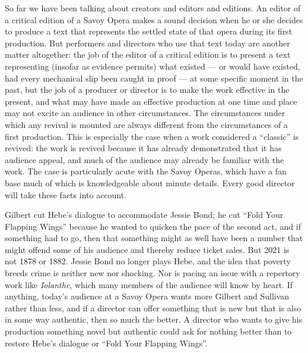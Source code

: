 \begin{paper}
So far we have been talking about creators and editors and editions. An
editor of a critical edition of a Savoy Opera makes a sound decision
when he or she decides to produce a text that represents the settled
state of that opera during its first production. But performers and
directors who use that text today are another matter altogether: the job
of the editor of a critical edition is to present a text representing
(insofar as evidence permits) what existed --- or would have existed, had
every mechanical slip been caught in proof --- at some specific moment in
the past, but the job of a producer or director is to make the work
effective in the present, and what may have made an effective production
at one time and place may not excite an audience in other circumstances.
The circumstances under which any revival is mounted are always
different from the circumstances of a first production. This is
especially the case when a work considered a ``classic'' is revived: the
work is revived because it has already demonstrated that it has audience
appeal, and much of the audience may already be familiar with the work.
The case is particularly acute with the Savoy Operas, which have a fan
base much of which is knowledgeable about minute details. Every good
director will take these facts into account.

Gilbert cut Hebe's dialogue to accommodate Jessie Bond; he cut ``Fold
Your Flapping Wings'' because he wanted to quicken the pace of the
second act, and if something had to go, then that something might as
well have been a number that might offend some of his audience and
thereby reduce ticket sales. But 2021 is not 1878 or 1882. Jessie Bond
no longer plays Hebe, and the idea that poverty breeds crime is neither
new nor shocking. Nor is pacing an issue with a repertory work like
\emph{Iolanthe}, which many members of the audience will know by heart.
If anything, today's audience at a Savoy Opera wants more Gilbert and
Sullivan rather than less, and if a director can offer something that is
new but that is also in some way authentic, then so much the better. A
director who wants to give his production something novel but authentic
could ask for nothing better than to restore Hebe's dialogue or ``Fold
Your Flapping Wings''.


\end{paper}
